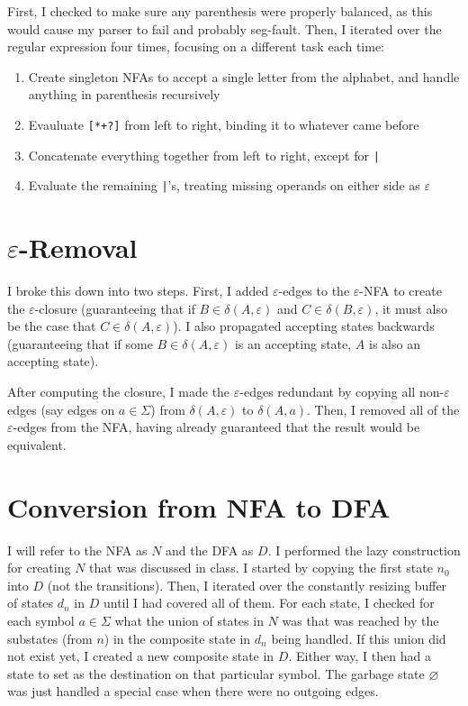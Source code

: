 \documentclass{article}
\begin{document}
First, I checked to make sure any parenthesis were properly balanced, as this would cause my parser to fail and probably seg-fault. Then, I iterated over the regular expression four times, focusing on a different task each time:
\begin{enumerate}
\item Create singleton NFAs to accept a single letter from the alphabet, and handle anything in parenthesis recursively
\item Evauluate \texttt{[*+?]} from left to right, binding it to whatever came before
\item Concatenate everything together from left to right, except for \texttt{|}
\item Evaluate the remaining \texttt{|}'s, treating missing operands on either side as $\varepsilon$
\end{enumerate}

\section*{$\varepsilon$-Removal}
I broke this down into two steps. First, I added $\varepsilon$-edges to the $\varepsilon$-NFA to create the $\varepsilon$-closure (guaranteeing that if $B\in\delta(A,\varepsilon)$ and $C\in\delta(B,\varepsilon)$, it must also be the case that $C\in\delta(A,\varepsilon)$). I also propagated accepting states backwards (guaranteeing that if some $B\in\delta(A,\varepsilon)$ is an accepting state, $A$ is also an accepting state).

After computing the closure, I made the $\varepsilon$-edges redundant by copying all non-$\varepsilon$ edges (say edges on $a\in\Sigma$) from $\delta(A,\varepsilon)$ to $\delta(A,a)$. Then, I removed all of the $\varepsilon$-edges from the NFA, having already guaranteed that the result would be equivalent.

\section*{Conversion from NFA to DFA}
I will refer to the NFA as $N$ and the DFA as $D$. I performed the lazy construction for creating $N$ that was discussed in class. I started by copying the first state $n_0$ into $D$ (not the transitions). Then, I iterated over the constantly resizing buffer of states $d_n$ in $D$ until I had covered all of them. For each state, I checked for each symbol $a\in\Sigma$ what the union of states in $N$ was that was reached by the substates (from $n$) in the composite state in $d_n$ being handled. If this union did not exist yet, I created a new composite state in $D$. Either way, I then had a state to set as the destination on that particular symbol. The garbage state $\varnothing$ was just handled a special case when there were no outgoing edges.
\end{document}
